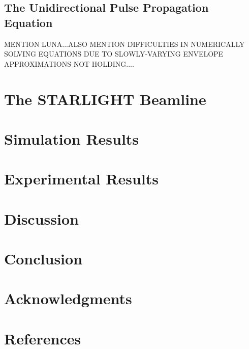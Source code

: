 \documentclass[a4paper]{jpconf}
\begin{document}
\subsection{The Unidirectional Pulse Propagation Equation }
MENTION LUNA...ALSO MENTION DIFFICULTIES IN NUMERICALLY SOLVING EQUATIONS DUE TO SLOWLY-VARYING ENVELOPE APPROXIMATIONS NOT HOLDING....

\section{The STARLIGHT Beamline}

\section{Simulation Results}

\section{Experimental Results}

\section{Discussion}

\section{Conclusion}

\section*{Acknowledgments}

\section*{References}


\end{document}
